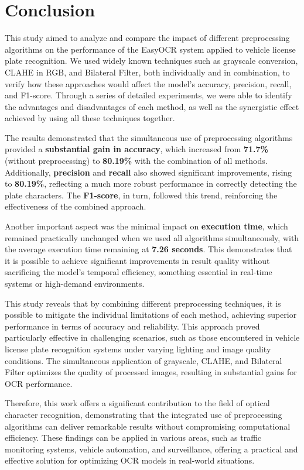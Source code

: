 \documentclass[conference]{IEEEtran}
\begin{document}
	\section{Conclusion}
	
	This study aimed to analyze and compare the impact of different preprocessing algorithms on the performance of the EasyOCR system applied to vehicle license plate recognition. We used widely known techniques such as grayscale conversion, CLAHE in RGB, and Bilateral Filter, both individually and in combination, to verify how these approaches would affect the model's accuracy, precision, recall, and F1-score. Through a series of detailed experiments, we were able to identify the advantages and disadvantages of each method, as well as the synergistic effect achieved by using all these techniques together.
	
	The results demonstrated that the simultaneous use of preprocessing algorithms provided a \textbf{substantial gain in accuracy}, which increased from \textbf{71.7\%} (without preprocessing) to \textbf{80.19\%} with the combination of all methods. Additionally, \textbf{precision} and \textbf{recall} also showed significant improvements, rising to \textbf{80.19\%}, reflecting a much more robust performance in correctly detecting the plate characters. The \textbf{F1-score}, in turn, followed this trend, reinforcing the effectiveness of the combined approach.
	
	Another important aspect was the minimal impact on \textbf{execution time}, which remained practically unchanged when we used all algorithms simultaneously, with the average execution time remaining at \textbf{7.26 seconds}. This demonstrates that it is possible to achieve significant improvements in result quality without sacrificing the model's temporal efficiency, something essential in real-time systems or high-demand environments.
	
	This study reveals that by combining different preprocessing techniques, it is possible to mitigate the individual limitations of each method, achieving superior performance in terms of accuracy and reliability. This approach proved particularly effective in challenging scenarios, such as those encountered in vehicle license plate recognition systems under varying lighting and image quality conditions. The simultaneous application of grayscale, CLAHE, and Bilateral Filter optimizes the quality of processed images, resulting in substantial gains for OCR performance.
	
	Therefore, this work offers a significant contribution to the field of optical character recognition, demonstrating that the integrated use of preprocessing algorithms can deliver remarkable results without compromising computational efficiency. These findings can be applied in various areas, such as traffic monitoring systems, vehicle automation, and surveillance, offering a practical and effective solution for optimizing OCR models in real-world situations.
	
\end{document}
